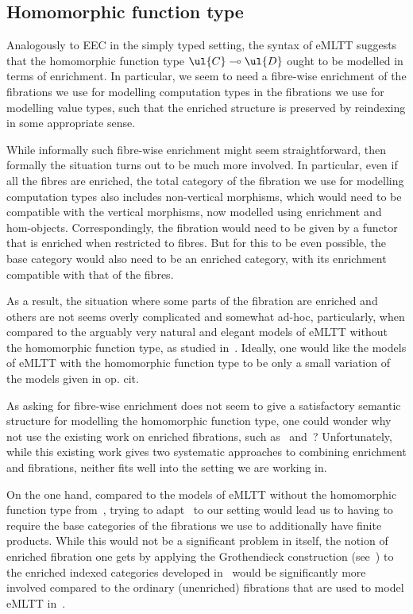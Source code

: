 \subsection{Homomorphic function type}
\label{sect:shallowenrichment}

Analogously to EEC in the simply typed setting, the syntax of eMLTT suggests that the homomorphic function type $\ul{C} \multimap \ul{D}$ ought to be modelled in terms of enrichment. In particular, we seem to need a fibre-wise enrichment of the fibrations we use for modelling computation types in the fibrations we use for modelling value types, such that the enriched structure is preserved by reindexing in some appropriate sense. 

While informally such fibre-wise enrichment might seem straightforward, then formally the situation turns out to be much more involved. In particular, even if all the fibres are enriched, the total category of the fibration we use for modelling computation types also includes non-vertical morphisms, which would need to be compatible with the vertical morphisms, now modelled using enrichment and hom-objects. 
Correspondingly, the fibration would need to be given by a functor that is enriched when restricted to fibres.
But for this to be even possible, the base category would also need to be an enriched category, with its enrichment compatible with that of the fibres. 

As a result, the situation where some parts of the fibration are enriched and others are not seems overly complicated and somewhat ad-hoc, particularly, when compared to the arguably very natural and elegant models of eMLTT without the homomorphic function type, as studied in~\cite{Ahman:FibredEffects}. Ideally, one would like the models of eMLTT with the homomorphic function type to be only a small variation of the models given in op. cit. 

As asking for fibre-wise enrichment does not seem to give a satisfactory semantic structure for modelling the homomorphic function type, one could wonder why not use the existing work on enriched fibrations, such as~\cite{Shulman:EnrichedIndexedCategories} and~\cite[Section~8.1]{Vasilakopoulou:Thesis}? Unfortunately, while this existing work gives two systematic approaches to combining enrichment and fibrations, neither fits well into the setting we are working in. 

On the one hand, compared to the models of eMLTT without the homomorphic function type from~\cite{Ahman:FibredEffects}, trying to adapt~\cite{Shulman:EnrichedIndexedCategories} to our setting would lead us to having to require the base categories of the fibrations we use to additionally have finite products. While this would not be a significant problem in itself, the notion of enriched fibration one gets by applying the Grothendieck construction (see~\cite[Definition~1.10.1]{Jacobs:Book}) to the enriched indexed categories developed in~\cite{Shulman:EnrichedIndexedCategories} would be significantly more involved compared to the ordinary (unenriched) fibrations that are used to model eMLTT in~\cite{Ahman:FibredEffects}. 

